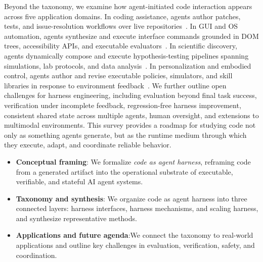 \documentclass{llmxive}
\begin{document}
Beyond the taxonomy, we examine how agent-initiated code interaction appears across five application domains. In coding assistance, agents author patches, tests, and issue-resolution workflows over live repositories~\cite{jimenez2023swe,yang2024swe,wang2024openhands}. In GUI and OS automation, agents synthesize and execute interface commands grounded in DOM trees, accessibility APIs, and executable evaluators~\cite{deng2023mind2webgeneralistagentweb,zhou2024webarenarealisticwebenvironment}. In scientific discovery, agents dynamically compose and execute hypothesis-testing pipelines spanning simulations, lab protocols, and data analysis~\cite{bran2023chemcrowaugmentinglargelanguagemodels,boiko2023autonomous,lu2024aiscientistfullyautomated,huang2025biomni}. In personalization and embodied control, agents author and revise executable policies, simulators, and skill libraries in response to environment feedback~\cite{ahn2022can,liang2023code,wang2023voyager}. We further outline open challenges for harness engineering, including evaluation beyond final task success, verification under incomplete feedback, regression-free harness improvement, consistent shared state across multiple agents, human oversight, and extensions to multimodal environments. This survey provides a roadmap for studying code not only as something agents generate, but as the runtime medium through which they execute, adapt, and coordinate reliable behavior.


\begin{tcolorbox}[agentcontrib]
\begin{itemize}
    \item \textbf{Conceptual framing}: We formalize
    \emph{code as agent harness}, reframing code from a generated
    artifact into the operational substrate of executable,
    verifiable, and stateful AI agent systems.

     \item \textbf{Taxonomy and synthesis}: We organize
   code as agent harness into three connected layers: harness
    interfaces, harness mechanisms, and scaling harness, and synthesize representative methods.

    \item \textbf{Applications and future agenda}:We connect the taxonomy
to real-world applications and outline key challenges in evaluation,
verification, safety, and coordination.
\end{itemize}
\end{tcolorbox}
\end{document}
